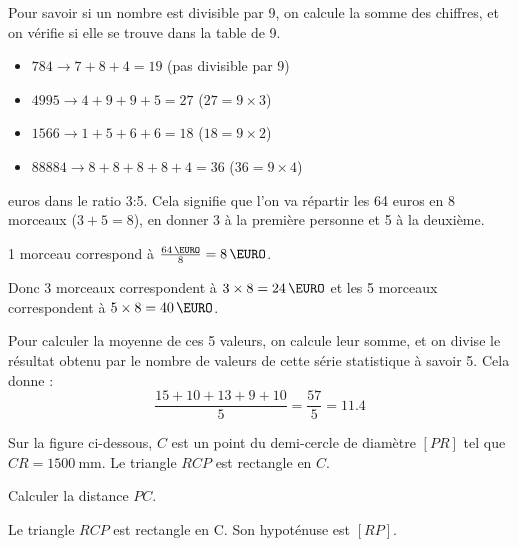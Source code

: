 \documentclass[../Cours.tex]{subfiles}
\begin{document}
\begin{questions}
{    \questionX Pour savoir si un nombre est divisible par 9, on calcule la somme des chiffres, et on vérifie si elle se trouve dans la table de 9.
    \begin{itemize}
        \item $784 \longrightarrow 7+8+4 = 19$ (pas divisible par 9)
        \item $4995 \longrightarrow 4+9+9+5 = 27$ ($27 = 9\times 3$)
        \item $1566 \longrightarrow 1+5+6+6 = 18 $ ($18 = 9 \times 2$)
        \item $88884 \longrightarrow 8+8+8+8+4 = 36$ ($36 = 9 \times 4$)
    \end{itemize}

     euros dans le ratio 3:5. Cela signifie que l'on va répartir les 64 euros en 8 morceaux ($3+5=8$), en donner 3 à la première personne et 5 à la deuxième.

    1 morceau correspond à $\frac{\qty{64}{\EURO}}{8} = \qty{8}{\EURO}$.

    Donc 3 morceaux correspondent à $3 \times 8 = \qty{24}{\EURO}$ et les 5 morceaux correspondent à $5 \times 8 = \qty{40}{\EURO}$.

    \questionX Pour calculer la moyenne de ces 5 valeurs, on calcule leur somme, et on divise le résultat obtenu par le nombre de valeurs de cette série statistique à savoir 5. Cela donne : 
    \[
        \frac{15+10+13+9+10}{5} = \frac{57}{5} = \num{11.4}
    \]
}

\exercice
Sur la figure ci-dessous, $C$ est un point du demi-cercle de diamètre $[PR]$ tel que $CR=\qty{1500}{\milli\metre}$. Le triangle $RCP$ est rectangle en $C$.

\begin{centre}
\end{centre}

\question Calculer la distance $PC$.

{\color{rouge}

Le triangle $RCP$ est rectangle en C. Son hypoténuse est $[RP]$.

}
\end{questions}
\end{document}
